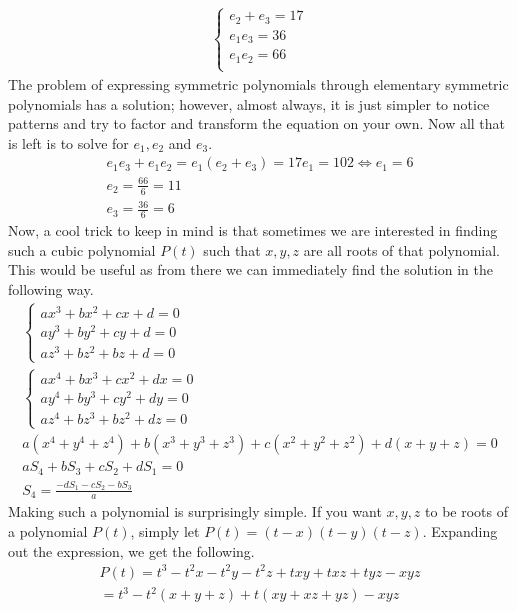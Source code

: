 \documentclass{article}
\begin{document}
\begin{gather*}
	\begin{cases}
		e_2 + e_3 = 17 \\
		e_1 e_3 = 36 \\
		e_1 e_2 = 66 \\
	\end{cases}
\end{gather*}
The problem of expressing symmetric polynomials through elementary symmetric polynomials has a solution; however, almost always, it is just simpler to notice patterns and try to factor and transform the equation on your own. Now all that is left is to solve for \(e_1, e_2\) and \(e_3\).
\begin{gather*}
	e_1 e_3 + e_1 e_2 = e_1(e_2 + e_3) = 17e_1 = 102 \Longleftrightarrow e_1 = 6 \\
	e_2 = \frac{66}{6} = 11 \\
	e_3 = \frac{36}{6} = 6
\end{gather*}
Now, a cool trick to keep in mind is that sometimes we are interested in finding such a cubic polynomial \(P(t)\) such that \(x, y, z\) are all roots of that polynomial. This would be useful as from there we can immediately find the solution in the following way.
\begin{gather*}
	\begin{cases}
		ax^3 + bx^2 + cx + d = 0 \\
		ay^3 + by^2 + cy + d = 0 \\
		az^3 + bz^2 + bz + d = 0
	\end{cases} \\
	\begin{cases}
		ax^4 + bx^3 + cx^2 + dx = 0 \\
		ay^4 + by^3 + cy^2 + dy = 0 \\
		az^4 + bz^3 + bz^2 + dz = 0
	\end{cases} \\
	a(x^4 + y^4 + z^4) + b(x^3 + y^3 + z^3) + c(x^2 + y^2 + z^2) + d(x + y + z) = 0 \\
	aS_4 + bS_3 + cS_2 + dS_1 = 0 \\
	S_4 = \frac{-dS_1 - cS_2 - bS_3}{a}
\end{gather*}
Making such a polynomial is surprisingly simple. If you want \(x, y, z\) to be roots of a polynomial \(P(t)\), simply let \(P(t) = (t - x)(t - y)(t - z)\). Expanding out the expression, we get the following.
\begin{multline*}
	P(t) = t^3 - t^2 x - t^2 y - t^2 z + t x y + t x z + t y z - x y z \\
	= t^3 - t^2(x + y + z) + t(xy + xz + yz) - xyz
\end{multline*}
\end{document}
